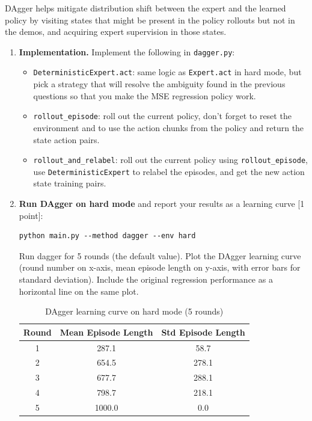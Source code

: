 \documentclass[12pt]{article}
\begin{document}
DAgger helps mitigate distribution shift between the expert and the learned policy by visiting states that might be present in the policy rollouts but not in the demos, and acquiring expert supervision in those states.

\begin{enumerate}

\item \textbf{Implementation.} Implement the following in \texttt{dagger.py}:

\begin{itemize}
    \item \texttt{DeterministicExpert.act}: same logic as \texttt{Expert.act} in hard mode, but pick a strategy that will resolve the ambiguity found in the previous questions so that you make the MSE regression policy work.
    \item \texttt{rollout\_episode}: roll out the current policy, don't forget to reset the environment and to use the action chunks from the policy and return the state action pairs.
    \item \texttt{rollout\_and\_relabel}: roll out the current policy using \texttt{rollout\_episode}, use \texttt{DeterministicExpert} to relabel the episodes, and get the new action state training pairs.
\end{itemize}

\item \textbf{Run DAgger on hard mode} and report your results as a learning curve [1 point]:

\begin{tcolorbox}[width=\linewidth, sharp corners=all, colback=white!95!black]
\begin{verbatim}
python main.py --method dagger --env hard
\end{verbatim}
\end{tcolorbox}

\noindent Run dagger for 5 rounds (the default value). Plot the DAgger learning curve (round number on x-axis, mean episode length on y-axis, with error bars for standard deviation). Include the original regression performance as a horizontal line on the same plot.

\begin{table}[h]
\centering
\begin{tabular}{ccc}
\hline
\textbf{Round} & \textbf{Mean Episode Length} & \textbf{Std Episode Length} \\
\hline
1 & 287.1 & 58.7 \\
2 & 654.5 & 278.1 \\
3 & 677.7 & 288.1 \\
4 & 798.7 & 218.1 \\
5 & 1000.0 & 0.0 \\
\hline
\end{tabular}
\caption{DAgger learning curve on hard mode (5 rounds)}
\end{table}


\end{enumerate}
\end{document}
